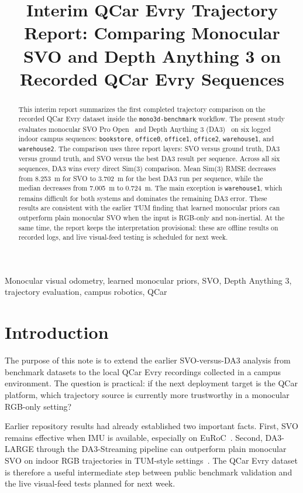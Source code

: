\documentclass[conference]{IEEEtran}
\title{Interim QCar Evry Trajectory Report: Comparing Monocular SVO and Depth Anything 3 on Recorded QCar Evry Sequences}
\author{
\IEEEauthorblockN{Project Report Draft}
\IEEEauthorblockA{mono3d-benchmark Experimental Notes\\
June 12, 2026}
}
\newcommand{\code}[1]{\mbox{\texttt{#1}}}
\begin{document}
\maketitle

\begin{abstract}
This interim report summarizes the first completed trajectory comparison on the recorded QCar Evry dataset inside the \texttt{mono3d-benchmark} workflow. The present study evaluates monocular SVO Pro Open~\cite{forster2017svo} and Depth Anything 3 (DA3)~\cite{lin2025depthanything3} on six logged indoor campus sequences: \code{bookstore}, \code{office0}, \code{office1}, \code{office2}, \code{warehouse1}, and \code{warehouse2}. The comparison uses three report layers: SVO versus ground truth, DA3 versus ground truth, and SVO versus the best DA3 result per sequence. Across all six sequences, DA3 wins every direct Sim(3) comparison. Mean Sim(3) RMSE decreases from 8.253~m for SVO to 3.702~m for the best DA3 run per sequence, while the median decreases from 7.005~m to 0.724~m. The main exception is \code{warehouse1}, which remains difficult for both systems and dominates the remaining DA3 error. These results are consistent with the earlier TUM finding that learned monocular priors can outperform plain monocular SVO when the input is RGB-only and non-inertial. At the same time, the report keeps the interpretation provisional: these are offline results on recorded logs, and live visual-feed testing is scheduled for next week.
\end{abstract}

\begin{IEEEkeywords}
Monocular visual odometry, learned monocular priors, SVO, Depth Anything 3, trajectory evaluation, campus robotics, QCar
\end{IEEEkeywords}

\section{Introduction}
The purpose of this note is to extend the earlier SVO-versus-DA3 analysis from benchmark datasets to the local QCar Evry recordings collected in a campus environment. The question is practical: if the next deployment target is the QCar platform, which trajectory source is currently more trustworthy in a monocular RGB-only setting?

Earlier repository results had already established two important facts. First, SVO remains effective when IMU is available, especially on EuRoC~\cite{burri2016euroc}. Second, DA3-LARGE through the DA3-Streaming pipeline can outperform plain monocular SVO on indoor RGB trajectories in TUM-style settings~\cite{sturm2012tumrgbd}. The QCar Evry dataset is therefore a useful intermediate step between public benchmark validation and the live visual-feed tests planned for next week.
\end{document}
